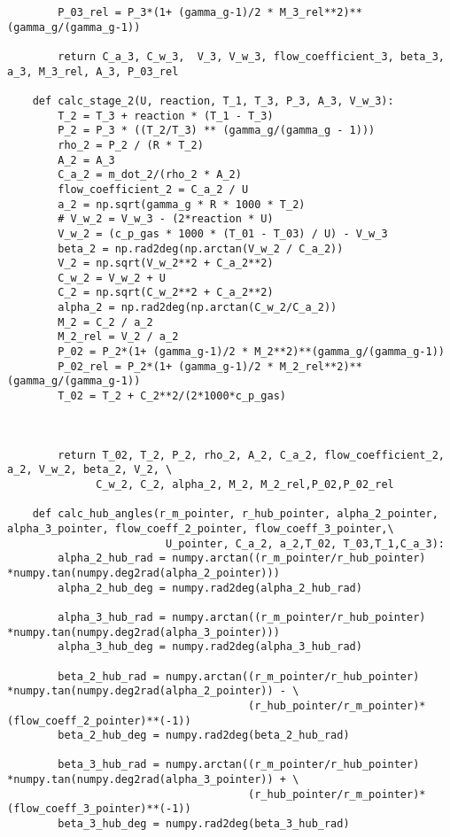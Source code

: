 \begin{verbatim}
        P_03_rel = P_3*(1+ (gamma_g-1)/2 * M_3_rel**2)**(gamma_g/(gamma_g-1))
        
        return C_a_3, C_w_3,  V_3, V_w_3, flow_coefficient_3, beta_3, a_3, M_3_rel, A_3, P_03_rel
    
    def calc_stage_2(U, reaction, T_1, T_3, P_3, A_3, V_w_3):
        T_2 = T_3 + reaction * (T_1 - T_3)
        P_2 = P_3 * ((T_2/T_3) ** (gamma_g/(gamma_g - 1)))
        rho_2 = P_2 / (R * T_2)
        A_2 = A_3
        C_a_2 = m_dot_2/(rho_2 * A_2)
        flow_coefficient_2 = C_a_2 / U
        a_2 = np.sqrt(gamma_g * R * 1000 * T_2)
        # V_w_2 = V_w_3 - (2*reaction * U)
        V_w_2 = (c_p_gas * 1000 * (T_01 - T_03) / U) - V_w_3
        beta_2 = np.rad2deg(np.arctan(V_w_2 / C_a_2))
        V_2 = np.sqrt(V_w_2**2 + C_a_2**2)
        C_w_2 = V_w_2 + U
        C_2 = np.sqrt(C_w_2**2 + C_a_2**2)
        alpha_2 = np.rad2deg(np.arctan(C_w_2/C_a_2))
        M_2 = C_2 / a_2
        M_2_rel = V_2 / a_2
        P_02 = P_2*(1+ (gamma_g-1)/2 * M_2**2)**(gamma_g/(gamma_g-1))
        P_02_rel = P_2*(1+ (gamma_g-1)/2 * M_2_rel**2)**(gamma_g/(gamma_g-1))
        T_02 = T_2 + C_2**2/(2*1000*c_p_gas)



        return T_02, T_2, P_2, rho_2, A_2, C_a_2, flow_coefficient_2, a_2, V_w_2, beta_2, V_2, \
              C_w_2, C_2, alpha_2, M_2, M_2_rel,P_02,P_02_rel
    
    def calc_hub_angles(r_m_pointer, r_hub_pointer, alpha_2_pointer, alpha_3_pointer, flow_coeff_2_pointer, flow_coeff_3_pointer,\
                         U_pointer, C_a_2, a_2,T_02, T_03,T_1,C_a_3):
        alpha_2_hub_rad = numpy.arctan((r_m_pointer/r_hub_pointer) *numpy.tan(numpy.deg2rad(alpha_2_pointer)))
        alpha_2_hub_deg = numpy.rad2deg(alpha_2_hub_rad)
    
        alpha_3_hub_rad = numpy.arctan((r_m_pointer/r_hub_pointer) *numpy.tan(numpy.deg2rad(alpha_3_pointer)))
        alpha_3_hub_deg = numpy.rad2deg(alpha_3_hub_rad)
    
        beta_2_hub_rad = numpy.arctan((r_m_pointer/r_hub_pointer) *numpy.tan(numpy.deg2rad(alpha_2_pointer)) - \
                                      (r_hub_pointer/r_m_pointer)*(flow_coeff_2_pointer)**(-1))
        beta_2_hub_deg = numpy.rad2deg(beta_2_hub_rad)
    
        beta_3_hub_rad = numpy.arctan((r_m_pointer/r_hub_pointer) *numpy.tan(numpy.deg2rad(alpha_3_pointer)) + \
                                      (r_hub_pointer/r_m_pointer)*(flow_coeff_3_pointer)**(-1))
        beta_3_hub_deg = numpy.rad2deg(beta_3_hub_rad)


\end{verbatim}
